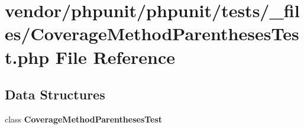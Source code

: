 \section{vendor/phpunit/phpunit/tests/\+\_\+files/\+Coverage\+Method\+Parentheses\+Test.php File Reference}
\label{phpunit_2tests_2__files_2_coverage_method_parentheses_test_8php}
\subsection*{Data Structures}
\begin{DoxyCompactItemize}
\item 
class {\bf Coverage\+Method\+Parentheses\+Test}
\end{DoxyCompactItemize}
